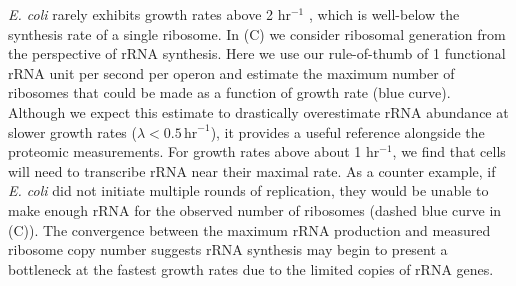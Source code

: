 \textit{E. coli} rarely exhibits growth rates above 2 hr$^{-1}$
\citep{bremer2008,roller2016}, which is well-below the synthesis rate of a
single ribosome. In (C) we consider ribosomal generation
from the perspective of rRNA synthesis. Here we use our rule-of-thumb of 1
functional rRNA unit per second per operon and estimate the maximum number of
ribosomes that could  be made as a function of growth rate (blue curve).
Although we expect this estimate to drastically overestimate rRNA abundance at
slower growth rates ($\lambda < 0.5\, \text{hr}^{-1}$), it provides a useful
reference alongside the proteomic measurements. For growth rates above about 1
hr$^{-1}$, we find that cells will need to transcribe rRNA near their maximal
rate. As a counter example, if \textit{E. coli} did not initiate multiple rounds
of replication, they would be unable to make enough rRNA for the observed number
of ribosomes (dashed blue curve in (C)). The convergence
between the maximum rRNA production and measured ribosome copy number suggests
rRNA synthesis may begin to present a bottleneck at the fastest growth rates due
to the limited copies of rRNA genes.
